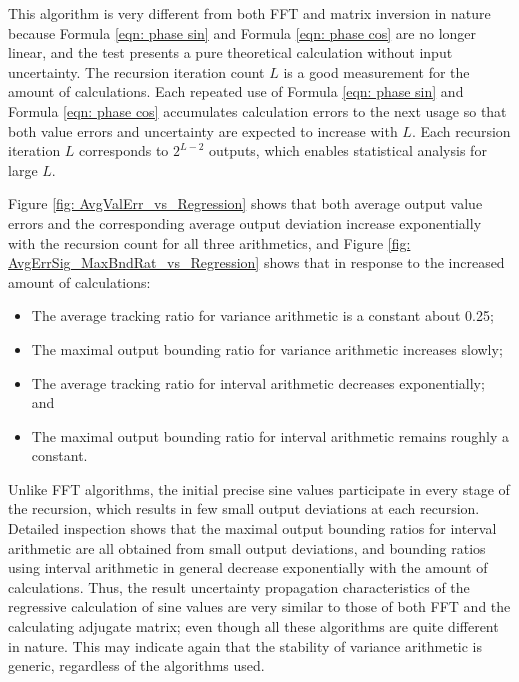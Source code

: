 \documentclass[twoside]{article}
\numberwithin{equation}{section}
\begin{document}
This algorithm is very different from both FFT and matrix inversion in nature because Formula \eqref{eqn: phase sin} and Formula \eqref{eqn: phase cos} are no longer linear, and the test presents a pure theoretical calculation without input uncertainty.  The recursion iteration count $L$ is a good measurement for the amount of calculations.  Each repeated use of Formula \eqref{eqn: phase sin} and Formula \eqref{eqn: phase cos} accumulates calculation errors to the next usage so that both value errors and uncertainty are expected to increase with $L$.  Each recursion iteration $L$ corresponds to $2^{L-2}$ outputs, which enables statistical analysis for large $L$.  

Figure \ref{fig: AvgValErr_vs_Regression} shows that both average output value errors and the corresponding average output deviation increase exponentially with the recursion count for all three arithmetics, and Figure \ref{fig: AvgErrSig_MaxBndRat_vs_Regression} shows that in response to the increased amount of calculations:
\begin{itemize}
\item The average tracking ratio for variance arithmetic is a constant about 0.25;

\item The maximal output bounding ratio for variance arithmetic increases slowly; 

\item The average tracking ratio for interval arithmetic decreases exponentially; and 

\item The maximal output bounding ratio for interval arithmetic remains roughly a constant.
\end{itemize}
Unlike FFT algorithms, the initial precise sine values participate in every stage of the recursion, which results in few small output deviations at each recursion.  Detailed inspection shows that the maximal output bounding ratios for interval arithmetic are all obtained from small output deviations, and bounding ratios using interval arithmetic in general decrease exponentially with the amount of calculations.  Thus, the result uncertainty propagation characteristics of the regressive calculation of sine values are very similar to those of both FFT and the calculating adjugate matrix; even though all these algorithms are quite different in nature.  This may indicate again that the stability of variance arithmetic is generic, regardless of the algorithms used.
\end{document}
